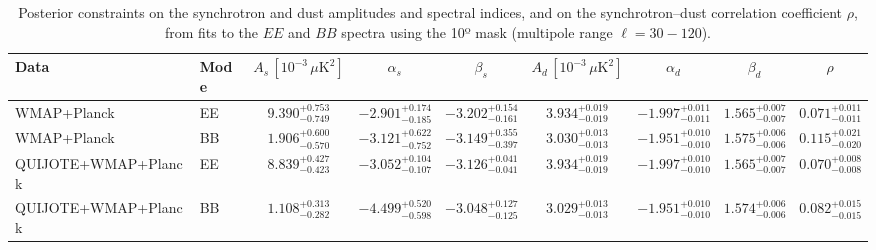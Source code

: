 \begin{table}[h]
\centering
\scriptsize
\setlength{\tabcolsep}{4pt}
\caption{Posterior constraints on the synchrotron and dust amplitudes and spectral indices, and on the synchrotron--dust correlation coefficient $\rho$, from fits to the $EE$ and $BB$ spectra using the 10º mask (multipole range $\ell=30-120$).}
\label{tab:fit_results}
\begin{tabular}{llccccccc}
\toprule
Data & Mode & $A_s\,[10^{-3}\,\mu\mathrm{K}^2]$ & $\alpha_s$ & $\beta_s$ & $A_d\,[10^{-3}\,\mu\mathrm{K}^2]$ & $\alpha_d$ & $\beta_d$ & $\rho$ \\
\midrule
WMAP+Planck & EE & $9.390^{+0.753}_{-0.749}$ & $-2.901^{+0.174}_{-0.185}$ & $-3.202^{+0.154}_{-0.161}$ & $3.934^{+0.019}_{-0.019}$ & $-1.997^{+0.011}_{-0.011}$ & $1.565^{+0.007}_{-0.007}$ & $0.071^{+0.011}_{-0.011}$ \\
WMAP+Planck & BB & $1.906^{+0.600}_{-0.570}$ & $-3.121^{+0.622}_{-0.752}$ & $-3.149^{+0.355}_{-0.397}$ & $3.030^{+0.013}_{-0.013}$ & $-1.951^{+0.010}_{-0.010}$ & $1.575^{+0.006}_{-0.006}$ & $0.115^{+0.021}_{-0.020}$ \\
QUIJOTE+WMAP+Planck & EE & $8.839^{+0.427}_{-0.423}$ & $-3.052^{+0.104}_{-0.107}$ & $-3.126^{+0.041}_{-0.041}$ & $3.934^{+0.019}_{-0.019}$ & $-1.997^{+0.010}_{-0.010}$ & $1.565^{+0.007}_{-0.007}$ & $0.070^{+0.008}_{-0.008}$ \\
QUIJOTE+WMAP+Planck & BB & $1.108^{+0.313}_{-0.282}$ & $-4.499^{+0.520}_{-0.598}$ & $-3.048^{+0.127}_{-0.125}$ & $3.029^{+0.013}_{-0.013}$ & $-1.951^{+0.010}_{-0.010}$ & $1.574^{+0.006}_{-0.006}$ & $0.082^{+0.015}_{-0.015}$ \\
\bottomrule
\end{tabular}
\end{table}
